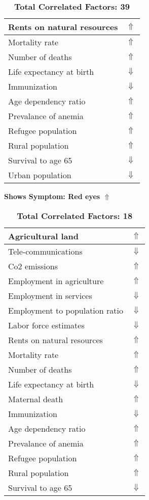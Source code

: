 \documentclass[12pt,notitlepage,oneside]{report}
\begin{document}
\begin{table}[!htb]
\begin{tabular}{|l|l|}
Rents on natural resources & $\Uparrow$\\ \hline
Mortality rate & $\Uparrow$\\ \hline
Number of deaths & $\Uparrow$\\ \hline
Life expectancy at birth & $\Downarrow$\\ \hline
Immunization & $\Downarrow$\\ \hline
Age dependency ratio & $\Uparrow$\\ \hline
Prevalance of anemia & $\Uparrow$\\ \hline
Refugee population & $\Uparrow$\\ \hline
Rural population & $\Uparrow$\\ \hline
Survival to age 65 & $\Downarrow$\\ \hline
Urban population & $\Downarrow$\\ \hline
\end{tabular}
\caption*{\textbf{Total Correlated Factors: 39}}
\end{table}
\clearpage
\begin{table}[!htb]
\caption{\textbf{Shows Symptom: Red eyes $\Uparrow$}}
\centering
\label{Correlated Socio-economic Factors0}
\begin{tabular}{|l|l|}
\hline
Agricultural land & $\Uparrow$\\ \hline
Tele-communications & $\Downarrow$\\ \hline
Co2 emissions & $\Uparrow$\\ \hline
Employment in agriculture & $\Uparrow$\\ \hline
Employment in services & $\Downarrow$\\ \hline
Employment to population ratio & $\Downarrow$\\ \hline
Labor force estimates & $\Downarrow$\\ \hline
Rents on natural resources & $\Uparrow$\\ \hline
Mortality rate & $\Uparrow$\\ \hline
Number of deaths & $\Uparrow$\\ \hline
Life expectancy at birth & $\Downarrow$\\ \hline
Maternal death & $\Uparrow$\\ \hline
Immunization & $\Downarrow$\\ \hline
Age dependency ratio & $\Uparrow$\\ \hline
Prevalance of anemia & $\Uparrow$\\ \hline
Refugee population & $\Uparrow$\\ \hline
Rural population & $\Uparrow$\\ \hline
Survival to age 65 & $\Downarrow$\\ \hline
\end{tabular}
\caption*{\textbf{Total Correlated Factors: 18}}
\end{table}
\end{document}

